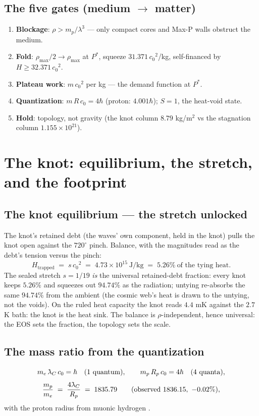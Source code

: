 \documentclass[11pt, a4paper]{article}
\newcommand{\cnot}{\ensuremath{c_0}}
\newcommand{\rhomax}{\ensuremath{\rho_{\mathrm{max}}}}
\newcommand{\snot}{\ensuremath{s}}
\newcommand{\lambdabar}{{\mathchar'26\mkern -9mu\lambda}} %
\begin{document}
\subsection{The five gates (medium $\to$ matter)}
\begin{enumerate}
\item \textbf{Blockage}: $\rho > m_p/\lambda^3$ --- only compact cores and Max-P
walls obstruct the medium.
\item \textbf{Fold}: $\rhomax/2 \to \rhomax$ at $P^*$, squeeze $31.371\,\cnot^2$/kg,
self-financed by $H \ge 32.371\,\cnot^2$.
\item \textbf{Plateau work}: $m\,\cnot^2$ per kg --- the demand function at $P^*$.
\item \textbf{Quantization}: $m\,R\,\cnot = 4\hbar$ (proton: $4.001\hbar$); $S=1$,
the heat-void state.
\item \textbf{Hold}: topology, not gravity (the knot column $8.79$ kg/m$^2$ vs the
stagnation column $1.155\times10^{21}$).
\end{enumerate}

\section{The knot: equilibrium, the stretch, and the footprint}
\label{sec:equilibrium}

\subsection{The knot equilibrium --- the stretch unlocked}
The knot's retained debt (the waves' own component, held in the knot) pulls the
knot open against the $720^\circ$ pinch. Balance, with the magnitudes read as
the debt's tension versus the pinch:
\begin{equation}
H_{\mathrm{trapped}} \;=\; \snot\,\cnot^2 \;=\; 4.73\times10^{15}\ \mathrm{J/kg}
\;=\; 5.26\%\ \text{of the tying heat.}
\end{equation}
The sealed stretch $\snot = 1/19$ \emph{is} the universal retained-debt fraction:
every knot keeps $5.26\%$ and squeezes out $94.74\%$ as the radiation; untying
re-absorbs the same $94.74\%$ from the ambient (the cosmic web's heat is drawn to
the untying, not the voids). On the ruled heat capacity the knot reads
$4.4$ mK against the $2.7$ K bath: the knot is the heat sink. The balance is
$\rho$-independent, hence universal: the EOS sets the fraction, the topology sets
the scale.

\subsection{The mass ratio from the quantization}
\begin{equation}
m_e\,\lambdabar_C\,\cnot = \hbar \quad (1\ \text{quantum}), \qquad
m_p\,R_p\,\cnot = 4\hbar \quad (4\ \text{quanta}),
\end{equation}
\begin{equation}
\frac{m_p}{m_e} \;=\; \frac{4\lambdabar_C}{R_p} \;=\; 1835.79
\qquad (\text{observed } 1836.15,\ -0.02\%),
\end{equation}
with the proton radius from muonic hydrogen \cite{antognini2013}.
\end{document}
